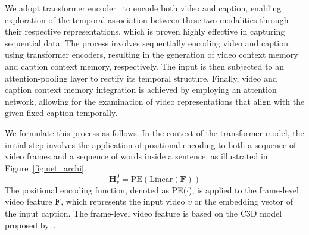 We adopt transformer encoder~\cite{Vaswani2017-sc} to encode both video and caption, enabling exploration of the temporal association between these two modalities through their respective representations, which is proven highly effective in capturing sequential data.
The process involves sequentially encoding video and caption using transformer encoders, resulting in the generation of video context memory and caption context memory, respectively.
The input is then subjected to an attention-pooling layer to rectify its temporal structure.
Finally, video and caption context memory integration is achieved by employing an attention network, allowing for the examination of video representations that align with the given fixed caption temporally.

We formulate this process as follows.
In the context of the transformer model, the initial step involves the application of positional encoding to both a sequence of video frames and a sequence of words inside a sentence, as illustrated in Figure~\ref{fig:net_archi}.
\begin{equation}
    \bm{H}_v^0 = \text{PE} (\text{Linear} \left( \bm{F} \right) )
    \label{eq:linear_transformation}
\end{equation}
The positional encoding function, denoted as PE($\cdot$), is applied to the frame-level video feature $\bm{F}$, which represents the input video $v$ or the embedding vector of the input caption.
The frame-level video feature is based on the C3D model proposed by~\cite{Tran2015-uq}.

